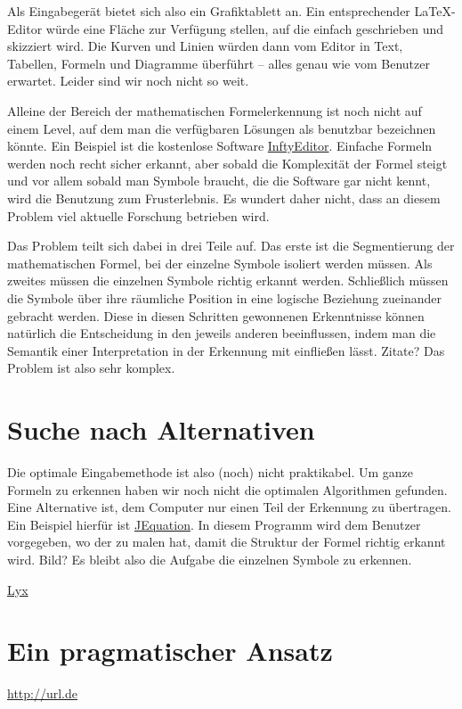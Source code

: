 Als Eingabegerät bietet sich also ein Grafiktablett an. Ein entsprechender \LaTeX-Editor würde eine Fläche zur Verfügung stellen, auf die einfach geschrieben und skizziert wird. Die Kurven und Linien würden dann vom Editor in Text, Tabellen, Formeln und Diagramme überführt -- alles genau wie vom Benutzer erwartet. Leider sind wir noch nicht so weit.

Alleine der Bereich der mathematischen Formelerkennung ist noch nicht auf einem Level, auf dem man die verfügbaren Lösungen als benutzbar bezeichnen könnte. Ein Beispiel ist die kostenlose Software \href{http://www.inftyproject.org}{InftyEditor}. Einfache Formeln werden noch recht sicher erkannt, aber sobald die Komplexität der Formel steigt und vor allem sobald man Symbole braucht, die die Software gar nicht kennt, wird die Benutzung zum Frusterlebnis. Es wundert daher nicht, dass an diesem Problem viel aktuelle Forschung betrieben wird.


Das Problem teilt sich dabei in drei Teile auf. Das erste ist die Segmentierung der mathematischen Formel, bei der einzelne Symbole isoliert werden müssen. Als zweites müssen die einzelnen Symbole richtig erkannt werden. Schließlich müssen die Symbole über ihre räumliche Position in eine logische Beziehung zueinander gebracht werden. Diese in diesen Schritten gewonnenen Erkenntnisse können natürlich die Entscheidung in den jeweils anderen beeinflussen, indem man die Semantik einer Interpretation in der Erkennung mit einfließen lässt. \TODO Zitate? Das Problem ist also sehr komplex.


\section{Suche nach Alternativen}

Die optimale Eingabemethode ist also (noch) nicht praktikabel. Um ganze Formeln zu erkennen haben wir noch nicht die optimalen Algorithmen gefunden. Eine Alternative ist, dem Computer nur einen Teil der Erkennung zu übertragen. Ein Beispiel hierfür ist \href{http://jequation.sourceforge.net/}{JEquation}. In diesem Programm wird dem Benutzer vorgegeben, wo der zu malen hat, damit die Struktur der Formel richtig erkannt wird. \TODO Bild? Es bleibt also die Aufgabe die einzelnen Symbole zu erkennen.



\href{http://lyx.org}{Lyx}


\section{Ein pragmatischer Ansatz}



\url{http://url.de}